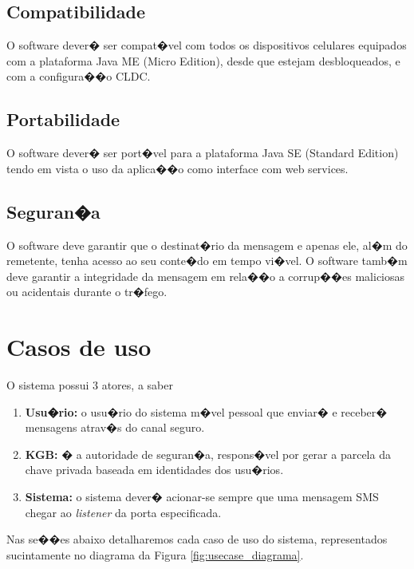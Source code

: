 \documentclass[a4paper,capchap,espacoduplo,normaltoc]{abntepusp}
\begin{document}
\subsection{Compatibilidade}
O software dever� ser compat�vel com todos os dispositivos celulares equipados com a plataforma Java ME (Micro Edition), desde que estejam desbloqueados, e com a configura��o CLDC.
\subsection{Portabilidade}
O software dever� ser port�vel para a plataforma Java SE (Standard Edition) tendo em vista o uso da aplica��o como interface com web services.
\subsection{Seguran�a}
O software deve garantir que o destinat�rio da mensagem e apenas ele, al�m do remetente, tenha acesso ao seu conte�do em tempo vi�vel. O software tamb�m deve garantir a integridade da mensagem em rela��o a corrup��es maliciosas ou acidentais durante o tr�fego.

\section{Casos de uso}

O sistema possui 3 atores, a saber
\begin{enumerate}
	\item \textbf{Usu�rio:} o usu�rio do sistema m�vel pessoal que enviar� e receber� mensagens atrav�s do canal seguro.
	\item \textbf{KGB:} � a autoridade de seguran�a, respons�vel por gerar a parcela da chave privada baseada em identidades dos usu�rios.
	\item \textbf{Sistema:} o sistema dever� acionar-se sempre que uma mensagem SMS chegar ao \emph{listener} da porta especificada.
\end{enumerate}

Nas se��es abaixo detalharemos cada caso de uso do sistema, representados sucintamente no diagrama da Figura \ref{fig:usecase_diagrama}.
\end{document}
